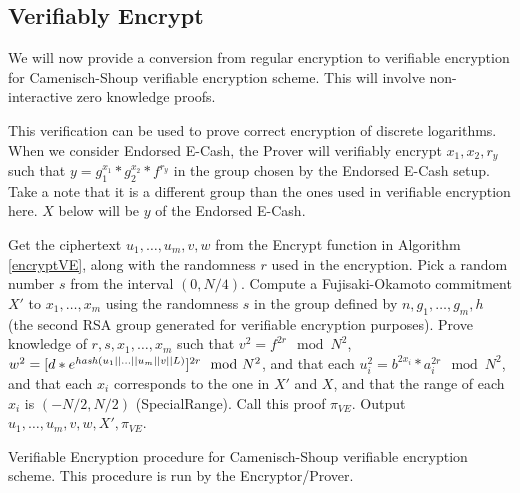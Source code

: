 \subsection{Verifiably Encrypt}
We will now provide a conversion from regular encryption to verifiable encryption for Camenisch-Shoup verifiable encryption scheme. This will involve non-interactive zero knowledge proofs.

This verification can be used to prove correct encryption of discrete logarithms. When we consider Endorsed E-Cash, the Prover will verifiably encrypt $x_1,x_2,r_y$ such that $y = g_1^{x_1} * g_2^{x_2} * f^{r_y}$ in the group chosen by the Endorsed E-Cash setup. Take a note that it is a different group than the ones used in verifiable encryption here. $X$ below will be $y$ of the Endorsed E-Cash.


\begin{algorithm}[H]\label{verifiablyEncryptVE}
\dontprintsemicolon

\BlankLine

 \;
\Indp
  Get the ciphertext $u_1,\ldots,u_m,v,w$ from the Encrypt function in Algorithm \ref{encryptVE}, along with the randomness $r$ used in the encryption. \;
  Pick a random number $s$ from the interval $(0,N / 4)$. \;
  Compute a Fujisaki-Okamoto commitment $X'$ to $x_1,\ldots,x_m$ using the randomness $s$ in the group defined by $n,g_1,\ldots,g_m,h$ (the second RSA group generated for verifiable encryption purposes). \;
  Prove knowledge of $r,s,x_1,\ldots,x_m$ such that $v^2 = f^{2r} \mod N^2$, $w^2 = [d * e^{\mathit{hash}(u_1 \mid\mid \ldots \mid\mid u_m \mid\mid v \mid\mid L)}]^{2r} \mod N^2$, and that each $u_{i}^2 = b^{2 x_i} * a_{i}^{2r} \mod N^2$, and that each $x_i$ corresponds to the one in $X'$ and $X$, and that the range of each $x_i$ is $(-N/2,N/2)$ (SpecialRange). Call this proof $\pi_{VE}$. \;
  Output $u_1,\ldots,u_m,v,w,X',\pi_{VE}$. \;
\Indm

\caption{Verifiable Encryption procedure for Camenisch-Shoup verifiable encryption scheme. This procedure is run by the Encryptor/Prover.}
\end{algorithm}



